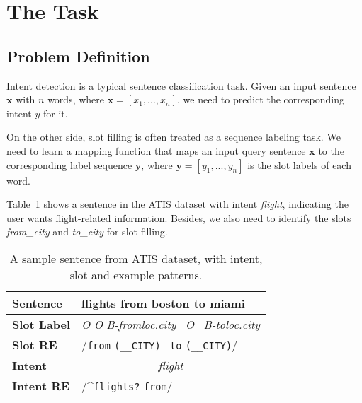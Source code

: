 \section{The Task}
\subsection{Problem Definition}
Intent detection is a typical sentence classification task.
Given an input sentence $\textbf{x}$ with $n$ words, where $\textbf{x}=[x_{1}, ..., x_{n}]$, we need to predict the corresponding intent $y$ for it.

On the other side, slot filling is often treated as a sequence labeling task.
We need to learn a mapping function that maps an input query sentence $\textbf{x}$ to the corresponding label sequence $\textbf{y}$, where $\textbf{y}=[y_{1}, ..., y_{n}]$ is the slot labels of each word.

Table~\ref{atis_sample} shows a sentence in the ATIS dataset with intent \emph{flight}, indicating the user wants flight-related information. Besides, we also need to identify the slots \emph{from\_city} and \emph{to\_city} for slot filling.

\begin{table}
\setlength{\tabcolsep}{0.23em}
\centering
\small{
\begin{tabular}{|l|l|}

\hline
\textbf{Sentence} &flights \;\;\;\;\;\;\;\; from \;\;\;\; boston \;\;\;\;\; to \;\;\; miami  \\
\hline
\textbf{Slot Label} &\;\;\; \emph{O} \;\;\;\;\;\;\;\;\;\;\; \emph{O} \; \emph{B-fromloc.city} \, \emph{O} \, \emph{B-toloc.city} \\
\hline
\textbf{Slot RE} & \multicolumn{1}{|l|}{\quad\quad\quad\;\;\;\;\;\;/\texttt{from} \; \texttt{(\_\_CITY)} \, \texttt{to}  \texttt{(\_\_CITY)}/} \\
\hline
\textbf{Intent} &\multicolumn{1}{|c|}{\emph{flight}} \\
\hline
\textbf{Intent RE} & \multicolumn{1}{|l|}{/\textasciicircum \texttt{flights?} \texttt{from}/} \\
\hline
\end{tabular}
}
\caption{A sample sentence from ATIS dataset, with intent, slot and example \RE patterns.}
\label{atis_sample}
\end{table}


